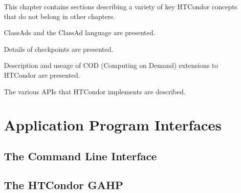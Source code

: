 This chapter contains sections describing a variety of key
HTCondor concepts that do not belong in other chapters.

ClassAds and the ClassAd language are presented.

Details of checkpoints are presented.

Description and useage of COD (Computing on Demand) extensions to HTCondor
are presented.

The various APIs that HTCondor implements are described.







\section{\label{sec:Misc-APIs}Application Program Interfaces}






\subsection{\label{API-commandline} The Command Line Interface}
\Todo

\subsection{\label{API-GAHP} The HTCondor GAHP}
\Todo



